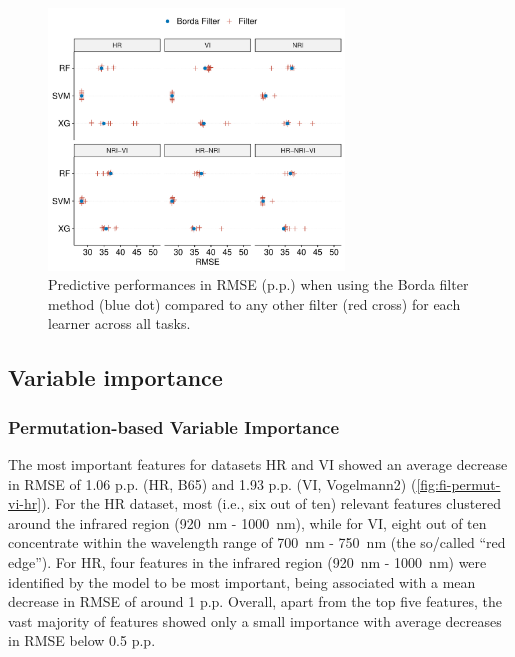 \documentclass[remotesensing,article,submit,moreauthors,pdftex]{Definitions/mdpi}
\begin{document}
\begin{figure} [t!]
	\centering
	\begin{center}
		\includegraphics[width=0.7\textwidth] {filter-effect-all-vs-borda-filter-1.pdf}
		\caption{Predictive performances in RMSE (p.p.) when using the Borda filter method (blue dot) compared to any other filter (red cross) for each learner across all tasks.}\label{fig:filter-effects-borda}
	\end{center}
\end{figure}

\subsection{Variable importance}

\subsubsection{Permutation-based Variable Importance}


The most important features for datasets HR and VI showed an average decrease in RMSE of 1.06 p.p. (HR, B65) and 1.93 p.p. (VI, Vogelmann2) (\autoref{fig:fi-permut-vi-hr}).
For the HR dataset, most (i.e., six out of ten) relevant features clustered around the infrared region (920~nm - 1000~nm), while for VI, eight out of ten concentrate within the wavelength range of 700~nm - 750~nm (the so\-/called \enquote{red edge}).
For HR, four features in the infrared region (920~nm - 1000~nm) were identified by the model to be most important, being associated with a mean decrease in RMSE of around 1 p.p.
Overall, apart from the top five features, the vast majority of features showed only a small importance with average decreases in RMSE below 0.5 p.p.
\end{document}
